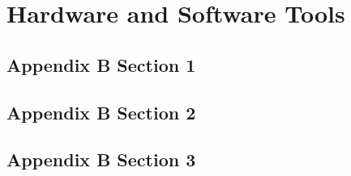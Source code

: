 
\chapter{Hardware and Software Tools} %
\label{AppendixB} %


\section{Appendix B Section 1}

\section{Appendix B Section 2}

\section{Appendix B Section 3}
